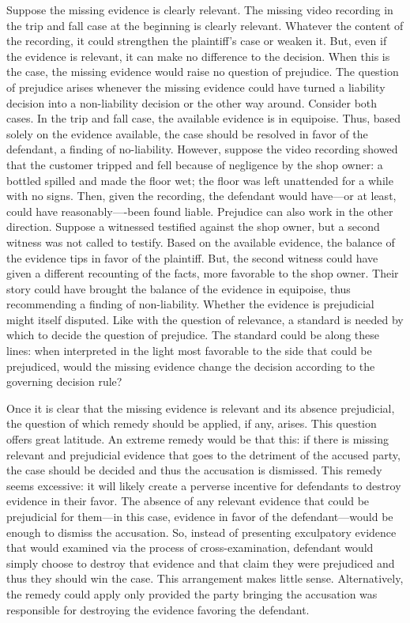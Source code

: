 \documentclass[
  10pt,
  dvipsnames,enabledeprecatedfontcommands]{scrartcl}
\begin{document}
Suppose the missing evidence is clearly relevant. The missing video
recording in the trip and fall case at the beginning is clearly
relevant. Whatever the content of the recording, it could strengthen the
plaintiff's case or weaken it. But, even if the evidence is relevant, it
can make no difference to the decision. When this is the case, the
missing evidence would raise no question of prejudice. The question of
prejudice arises whenever the missing evidence could have turned a
liability decision into a non-liability decision or the other way
around. Consider both cases. In the trip and fall case, the available
evidence is in equipoise. Thus, based solely on the evidence available,
the case should be resolved in favor of the defendant, a finding of
no-liability. However, suppose the video recording showed that the
customer tripped and fell because of negligence by the shop owner: a
bottled spilled and made the floor wet; the floor was left unattended
for a while with no signs. Then, given the recording, the defendant
would have---or at least, could have reasonably----been found liable.
Prejudice can also work in the other direction. Suppose a witnessed
testified against the shop owner, but a second witness was not called to
testify. Based on the available evidence, the balance of the evidence
tips in favor of the plaintiff. But, the second witness could have given
a different recounting of the facts, more favorable to the shop owner.
Their story could have brought the balance of the evidence in equipoise,
thus recommending a finding of non-liability. Whether the evidence is
prejudicial might itself disputed. Like with the question of relevance,
a standard is needed by which to decide the question of prejudice. The
standard could be along these lines: when interpreted in the light most
favorable to the side that could be prejudiced, would the missing
evidence change the decision according to the governing decision rule?

Once it is clear that the missing evidence is relevant and its absence
prejudicial, the question of which remedy should be applied, if any,
arises. This question offers great latitude. An extreme remedy would be
that this: if there is missing relevant and prejudicial evidence that
goes to the detriment of the accused party, the case should be decided
and thus the accusation is dismissed. This remedy seems excessive: it
will likely create a perverse incentive for defendants to destroy
evidence in their favor. The absence of any relevant evidence that could
be prejudicial for them---in this case, evidence in favor of the
defendant---would be enough to dismiss the accusation. So, instead of
presenting exculpatory evidence that would examined via the process of
cross-examination, defendant would simply choose to destroy that
evidence and that claim they were prejudiced and thus they should win
the case. This arrangement makes little sense. Alternatively, the remedy
could apply only provided the party bringing the accusation was
responsible for destroying the evidence favoring the defendant.
\end{document}
